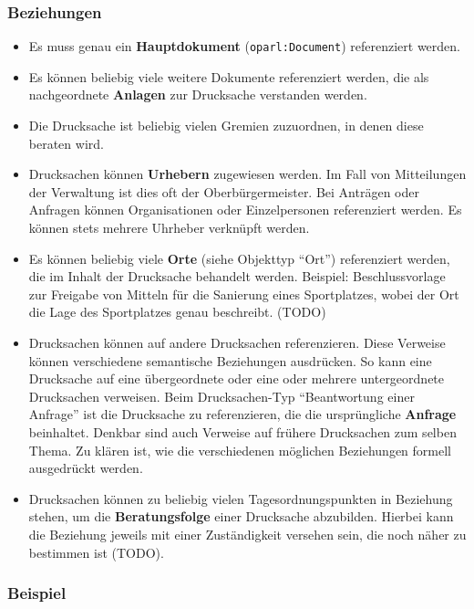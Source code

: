 \documentclass[,a4paper]{article}
\begin{document}
\subsubsection{Beziehungen}\label{beziehungen}

\begin{itemize}
\itemsep1pt\parskip0pt
\item
  Es muss genau ein \textbf{Hauptdokument} (\texttt{oparl:Document})
  referenziert werden.
\item
  Es können beliebig viele weitere Dokumente referenziert werden, die
  als nachgeordnete \textbf{Anlagen} zur Drucksache verstanden werden.
\item
  Die Drucksache ist beliebig vielen Gremien zuzuordnen, in denen diese
  beraten wird.
\item
  Drucksachen können \textbf{Urhebern} zugewiesen werden. Im Fall von
  Mitteilungen der Verwaltung ist dies oft der Oberbürgermeister. Bei
  Anträgen oder Anfragen können Organisationen oder Einzelpersonen
  referenziert werden. Es können stets mehrere Uhrheber verknüpft
  werden.
\item
  Es können beliebig viele \textbf{Orte} (siehe Objekttyp ``Ort'')
  referenziert werden, die im Inhalt der Drucksache behandelt werden.
  Beispiel: Beschlussvorlage zur Freigabe von Mitteln für die Sanierung
  eines Sportplatzes, wobei der Ort die Lage des Sportplatzes genau
  beschreibt. (TODO)
\item
  Drucksachen können auf andere Drucksachen referenzieren. Diese
  Verweise können verschiedene semantische Beziehungen ausdrücken. So
  kann eine Drucksache auf eine übergeordnete oder eine oder mehrere
  untergeordnete Drucksachen verweisen. Beim Drucksachen-Typ
  ``Beantwortung einer Anfrage'' ist die Drucksache zu referenzieren,
  die die ursprüngliche \textbf{Anfrage} beinhaltet. Denkbar sind auch
  Verweise auf frühere Drucksachen zum selben Thema. Zu klären ist, wie
  die verschiedenen möglichen Beziehungen formell ausgedrückt werden.
\item
  Drucksachen können zu beliebig vielen Tagesordnungspunkten in
  Beziehung stehen, um die \textbf{Beratungsfolge} einer Drucksache
  abzubilden. Hierbei kann die Beziehung jeweils mit einer Zuständigkeit
  versehen sein, die noch näher zu bestimmen ist (TODO).
\end{itemize}

\subsubsection{Beispiel}\label{beispiel}
\end{document}
